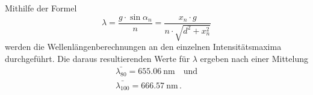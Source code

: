 Mithilfe der Formel
\begin{equation}
    \lambda=\frac{g \cdot \sin \alpha_n}{n} = \frac{x_n \cdot g}{n \cdot \sqrt{d^2+x_n^2}}
\end{equation} 
werden die Wellenlängenberechnungen an den einzelnen Intensitätsmaxima durchgeführt. 
Die daraus resultierenden Werte für $\lambda$ ergeben nach einer Mittelung
\begin{align*}
    \bar{\lambda_{80}} = \qty{655.06}{\nano\meter} \quad \text{und} \\
    \bar{\lambda_{100}} = \qty{666.57}{\nano\meter} \, .
\end{align*}
